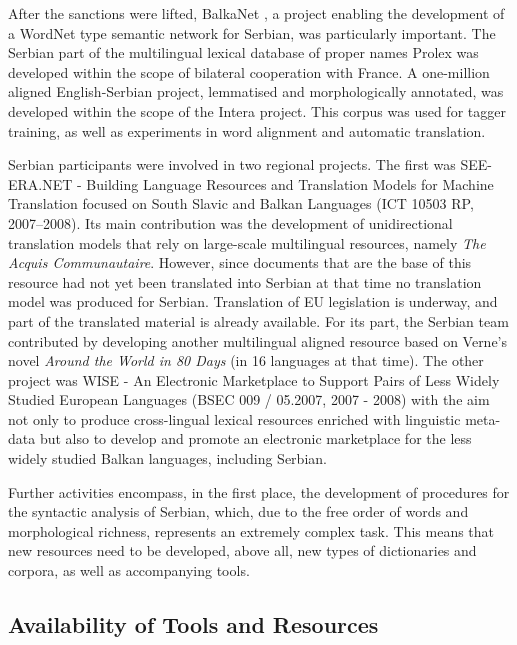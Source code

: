 \begin{multicols}{2}
After the sanctions were lifted, BalkaNet \cite{CORDIS}, a project enabling the development of a WordNet type semantic network for Serbian, was particularly important. The Serbian part of the multilingual lexical database of proper names Prolex \cite{CNRTL} was developed within the scope of bilateral cooperation with France. A one-million aligned English-Serbian project, lemmatised and morphologically annotated, was developed within the scope of the Intera project.  This corpus was used for tagger training, as well as experiments in word alignment and automatic translation. 

Serbian participants were involved in two regional projects. The first was SEE-ERA.NET - Building Language Resources and Translation Models for Machine Translation focused on South Slavic and Balkan Languages (ICT 10503 RP, 2007--2008). Its main contribution was the development of unidirectional translation models that rely on large-scale multilingual resources, namely \textit{The Acquis Communautaire}. However, since documents that are the base of this resource had not yet been translated into Serbian at that time no translation model was produced for Serbian. Translation of EU legislation is underway, and part of the translated material is already available. \cite{PREVODJENJE} For its part, the Serbian team contributed by developing another multilingual aligned resource based on Verne’s novel \textit{Around the World in 80 Days} (in 16 languages at that time).  The other project was WISE - An Electronic Marketplace to Support Pairs of Less Widely Studied European Languages (BSEC 009 / 05.2007, 2007 - 2008) with the aim not only to produce cross-lingual lexical resources enriched with linguistic meta-data but also to develop and promote an electronic marketplace for the less widely studied Balkan languages, including Serbian.

Further activities encompass, in the first place, the development of procedures for the syntactic analysis of Serbian, which, due to the free order of words and morphological richness, represents an extremely complex task. This means that new resources need to be developed, above all, new types of dictionaries and corpora, as well as accompanying tools.  


 \subsection {Availability of Tools and Resources}
   

\end{multicols}
